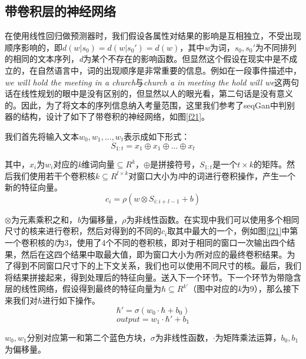 \documentclass[12pt]{template}
\begin{document}
\subsection{带卷积层的神经网络}
在使用线性回归做预测器时，我们假设各属性对结果的影响是互相独立，不受出现顺序影响的，即\(d(w|s_0)=d(w|s_0')=d(w)\)，其中\textit{w}为词，\(s_0,s_0'\)为不同排列的相同的文本序列，\textit{d}为某个不存在的影响函数。但显然这个假设在现实中是不成立的，在自然语言中，词的出现顺序是非常重要的信息。例如在一段事件描述中，\textit{we will hold the meeting in a church}与\textit{church a in meeting the hold will we}这两句话在线性规划的眼中是没有区别的，但显然以人的眼光看，第二句话是没有意义的。因此，为了将文本的序列信息纳入考量范围，这里我们参考了seqGan\cite{yu_seqgan:_2016}中判别器的结构，设计了如下了带卷积的神经网络，如图\ref{f21}。

我们首先将输入文本\(w_0,w_1,...,w_t\)表示成如下形式：
\begin{equation}
S_{1:t}=x_1\oplus x_1\oplus...\oplus x_t
\end{equation}

其中，\(x_i\)为\(w_i\)对应的\textit{k}维词向量\(\subseteq R^k\)，\(\oplus\)是拼接符号，\(S_{1:t}\)是一个\(t\times k\)的矩阵。然后我们使用若干个卷积核\(k\subseteq R^{l\times k}\)对窗口大小为\textit{l}中的词进行卷积操作，产生一个新的特征向量。
\begin{equation}
c_i=\rho(w\otimes S_{i:i+l-1}+b)
\end{equation}

\(\otimes\)为元素乘积之和，\textit{b}为偏移量，\(\rho\)为非线性函数。在实现中我们可以使用多个相同尺寸的核来进行卷积，然后对得到的不同的\(c_i\)取其中最大的一个，例如图\ref{f21}中第一个卷积核的\textit{l}为3，使用了4个不同的卷积核，即对于相同的窗口一次输出四个结果，然后在这四个结果中取最大值，即为窗口大小为\textit{l}所对应的最终卷积结果。为了得到不同窗口尺寸下的上下文关系，我们也可以使用不同尺寸的核。最后，我们将结果拼接起来，得到处理后的特征向量。送入下一个环节。下一个环节为带隐含层的线性网络，假设得到最终的特征向量为\(\hbar\subseteq R^{k'}\)（图中对应的\textit{k}为9），那么接下来我们对\(\hbar\)进行如下操作。
\begin{equation}
\hbar'=\sigma(w_0\cdot\hbar+b_0)
\end{equation}
\begin{equation}
output = w_1\cdot\hbar'+b_1
\end{equation}

\(w_0,w_1\)分别对应第一和第二个蓝色方块，\(\sigma\)为非线性函数，\(\cdot\)为矩阵乘法运算，\(b_0,b_1\)为偏移量。
\end{document}
